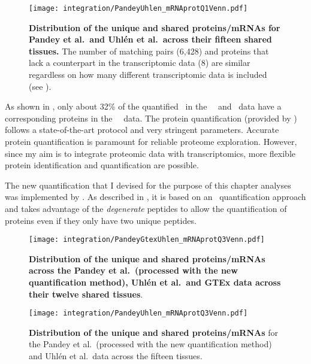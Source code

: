 \begin{figure}[!htpb]
    \texttt{[image: integration/PandeyUhlen\_mRNAprotQ1Venn.pdf]}\centering
    \vspace{-5mm}
    \caption[Distribution of the unique and shared proteins/mRNAs for Pandey et al.\
    and Uhlén et al.\ across fifteen tissues.]{%
    \label{fig:PU_vennQ1}\textbf{Distribution of the unique and shared proteins/mRNAs
    for Pandey et al.\ and Uhlén et al.\ across their fifteen shared tissues.}
    The number of matching pairs (6,428) and proteins that lack a counterpart in
    the transcriptomic data (8) are similar regardless on how many different
    transcriptomic data is included (see \Cref{fig:PGU_vennQ1}).}
\end{figure}

As shown in ,
only about 32\% of the quantified \mRNAs\ in the \uhlen\ \etal\ and \gtex\ data
have a corresponding proteins in the \pandey\ \etal\ data.
The protein quantification (provided by \james) follows
a state-of-the-art protocol and very stringent parameters.
Accurate protein quantification is paramount for reliable proteome exploration.
However, since my aim is to integrate proteomic data with transcriptomics,
more flexible protein identification and quantification are possible.

The new quantification that I devised for the purpose of this chapter analyses
was implemented by \james.
As described in ,
it is based on an \Rnaseq\ quantification approach and
takes advantage of the \emph{degenerate} peptides
to allow the quantification of proteins
even if they only have two unique peptides.

\begin{figure}[!htbp]
    \texttt{[image: integration/PandeyGtexUhlen\_mRNAprotQ3Venn.pdf]}\centering
    \caption[Distribution of the unique and shared proteins/mRNAs
    across the three datasets and twelve tissues
    (with the new protein quantification method)]{\label{fig:PGU_venQ3}%
    \textbf{Distribution of the unique and shared proteins/mRNAs
    across the Pandey et al.\ (processed with the new quantification method),
    Uhlén et al.\ and GTEx data across their twelve shared tissues}.
    }
\end{figure}

\begin{figure}[!htbp]
    \texttt{[image: integration/PandeyUhlen\_mRNAprotQ3Venn.pdf]}\centering
    \caption[Distribution of the unique and shared proteins/mRNAs for the
    Pandey et al.\ (processed with the new quantification method) and Uhlén et al.\ data
    across the fifteen tissues.
    ]{\label{fig:PU_vennQ3}\textbf{Distribution of the
    unique and shared proteins/mRNAs} for
    the Pandey et al.\ (processed with the new quantification method)
    and Uhlén et al.\ data across the fifteen tissues.}
\end{figure}

